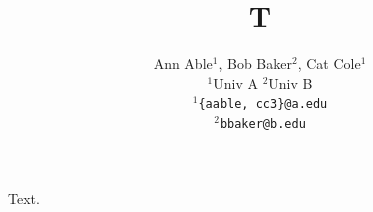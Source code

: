\documentclass{article}
\title{T}
\author{Ann Able$^1$, Bob Baker$^2$, Cat Cole$^1$ \\
$^1$Univ A \quad $^2$Univ B \\
{\tt $^1$\{aable, cc3\}@a.edu} \\
{\tt $^2$bbaker@b.edu}}
\begin{document}
\maketitle
Text.
\end{document}

